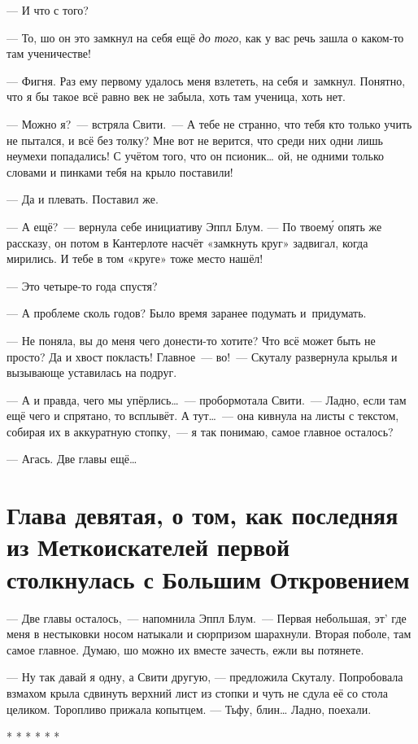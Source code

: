 \documentclass[fontsize=11pt,a5paper,titlepage=firstcover]{scrbook}
\begin{document}
--- И что с того?

--- То, шо он это замкнул на себя ещё \emph{до того}, как у вас речь зашла о каком-то там ученичестве!

--- Фигня. Раз ему первому удалось меня взлететь, на себя и~замкнул. Понятно, что я бы такое всё равно век не забыла, хоть там ученица, хоть нет.

--- Можно я?~--- встряла Свити.~--- А тебе не странно, что тебя кто только учить не пытался, и всё без толку? Мне вот не верится, что среди них одни лишь неумехи попадались! С учётом того, что он псионик{\ldots} ой, не одними только словами и пинками тебя на крыло поставили!

--- Да и плевать. Поставил же.

--- А ещё?~--- вернула себе инициативу Эппл Блум. --- По твоему́ опять же рассказу, он потом в Кантерлоте насчёт «замкнуть круг» задвигал, когда мирились. И тебе в том «круге» тоже место нашёл!

--- Это четыре-то года спустя?

--- А проблеме сколь годов? Было время заранее подумать и~придумать.

--- Не поняла, вы до меня чего донести-то хотите? Что всё может быть не просто? Да и хвост покласть! Главное~--- во!~--- Скуталу развернула крылья и вызывающе уставилась на подруг.

--- А и правда, чего мы упёрлись{\ldots}~--- пробормотала Свити.~--- Ладно, если там ещё чего и спрятано, то всплывёт. А тут{\ldots}~--- она кивнула на листы с текстом, собирая их в аккуратную стопку,~--- я так понимаю, самое главное осталось?

--- Агась. Две главы ещё{\ldots}



\chapter*{Глава девятая, о том, как последняя из Меткоискателей первой столкнулась с Большим Откровением}

--- Две главы осталось,~--- напомнила Эппл Блум.~--- Первая небольшая, эт’ где меня в нестыковки носом натыкали и сюрпризом шарахнули. Вторая поболе, там самое главное. Думаю, шо можно их вместе зачесть, ежли вы потянете.

--- Ну так давай я одну, а Свити другую, --- предложила Скуталу. Попробовала взмахом крыла сдвинуть верхний лист из стопки и чуть не сдула её со стола целиком. Торопливо прижала копытцем. --- Тьфу, блин{\ldots} Ладно, поехали.
\begin{center}* * * * * *\end{center}
\end{document}
